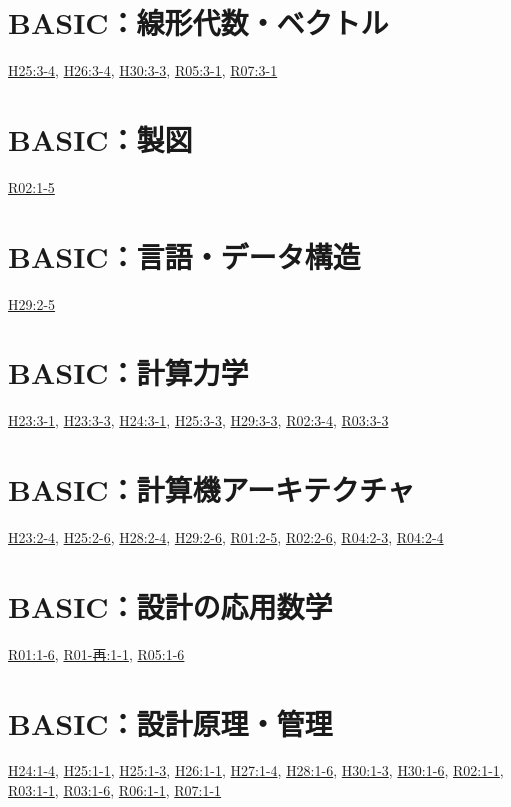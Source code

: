 \section{BASIC：線形代数・ベクトル}
\hyperref[q:h25-reg-basic-3-4]{H25:3-4}, \hyperref[q:h26-reg-basic-3-4]{H26:3-4}, \hyperref[q:h30-reg-basic-3-3]{H30:3-3}, \hyperref[q:r05-reg-basic-3-1]{R05:3-1}, \hyperref[q:r07-reg-basic-3-1]{R07:3-1}
\section{BASIC：製図}
\hyperref[q:r02-reg-basic-1-5]{R02:1-5}
\section{BASIC：言語・データ構造}
\hyperref[q:h29-reg-basic-2-5]{H29:2-5}
\section{BASIC：計算力学}
\hyperref[q:h23-reg-basic-3-1]{H23:3-1}, \hyperref[q:h23-reg-basic-3-3]{H23:3-3}, \hyperref[q:h24-reg-basic-3-1]{H24:3-1}, \hyperref[q:h25-reg-basic-3-3]{H25:3-3}, \hyperref[q:h29-reg-basic-3-3]{H29:3-3}, \hyperref[q:r02-reg-basic-3-4]{R02:3-4}, \hyperref[q:r03-reg-basic-3-3]{R03:3-3}
\section{BASIC：計算機アーキテクチャ}
\hyperref[q:h23-reg-basic-2-4]{H23:2-4}, \hyperref[q:h25-reg-basic-2-6]{H25:2-6}, \hyperref[q:h28-reg-basic-2-4]{H28:2-4}, \hyperref[q:h29-reg-basic-2-6]{H29:2-6}, \hyperref[q:r01-reg-basic-2-5]{R01:2-5}, \hyperref[q:r02-reg-basic-2-6]{R02:2-6}, \hyperref[q:r04-reg-basic-2-3]{R04:2-3}, \hyperref[q:r04-reg-basic-2-4]{R04:2-4}
\section{BASIC：設計の応用数学}
\hyperref[q:r01-reg-basic-1-6]{R01:1-6}, \hyperref[q:r01-ret-basic-1-1]{R01-再:1-1}, \hyperref[q:r05-reg-basic-1-6]{R05:1-6}
\section{BASIC：設計原理・管理}
\hyperref[q:h24-reg-basic-1-4]{H24:1-4}, \hyperref[q:h25-reg-basic-1-1]{H25:1-1}, \hyperref[q:h25-reg-basic-1-3]{H25:1-3}, \hyperref[q:h26-reg-basic-1-1]{H26:1-1}, \hyperref[q:h27-reg-basic-1-4]{H27:1-4}, \hyperref[q:h28-reg-basic-1-6]{H28:1-6}, \hyperref[q:h30-reg-basic-1-3]{H30:1-3}, \hyperref[q:h30-reg-basic-1-6]{H30:1-6}, \hyperref[q:r02-reg-basic-1-1]{R02:1-1}, \hyperref[q:r03-reg-basic-1-1]{R03:1-1}, \hyperref[q:r03-reg-basic-1-6]{R03:1-6}, \hyperref[q:r06-reg-basic-1-1]{R06:1-1}, \hyperref[q:r07-reg-basic-1-1]{R07:1-1}
